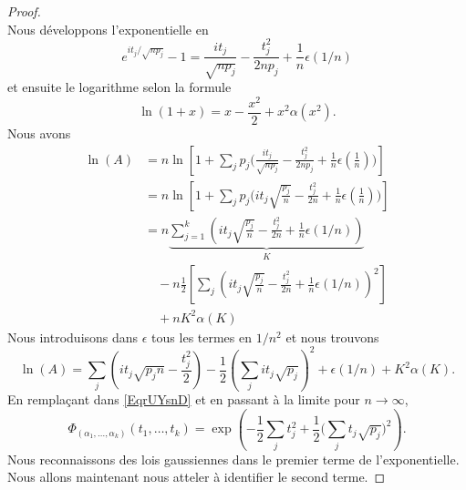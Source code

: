\begin{proof}
\begin{equation}
	\end{equation}
	Nous développons l'exponentielle en
	\begin{equation}
		e^{it_j/\sqrt{np_j}}-1=\frac{ it_j }{ \sqrt{np_j} }-\frac{ t_j^2 }{ 2np_j }+\frac{1}{ n }\epsilon(1/n)
	\end{equation}
	et ensuite le logarithme selon la formule
	\begin{equation}
		\ln(1+x)=x-\frac{ x^2 }{2}+x^2\alpha(x^2).
	\end{equation}
	Nous avons
	\begin{subequations}
		\begin{align}
			\ln(A) & =n\ln\left[ 1+\sum_jp_j\Big( \frac{ it_j }{ \sqrt{np_j} }-\frac{ t_j^2 }{ 2np_j }+\frac{1}{ n }\epsilon(\frac{1}{ n }) \Big) \right]     \\
			       & =n\ln\left[ 1+\sum_jp_j\Big(it_j \sqrt{\frac{ p_j }{ n }}-\frac{ t_j^2 }{ 2n}+\frac{1}{ n }\epsilon(\frac{1}{ n }) \Big) \right]         \\
			       & =n\underbrace{\sum_{j=1}^k\left( it_j\sqrt{\frac{ p_j }{ n }}-\frac{ t_j^2 }{ 2n }+\frac{1}{ n }\epsilon(1/n) \right)}_{K}               \\
			       & \quad-n\frac{ 1 }{2}\left[ \sum_{j}\left( it_j\sqrt{\frac{ p_j }{ n }}-\frac{ t_j^2 }{ 2n }+\frac{1}{ n }\epsilon(1/n) \right)^2 \right] \\
			       & \quad +nK^2\alpha(K)
		\end{align}
	\end{subequations}
	Nous introduisons dans \( \epsilon\) tous les termes en \( 1/n^2\) et nous trouvons
	\begin{equation}
		\ln(A)=\sum_j\left( it_j\sqrt{p_jn}-\frac{ t_j^2 }{2} \right)-\frac{ 1 }{2}\left( \sum_jit_j\sqrt{p_j} \right)^2+\epsilon(1/n)+K^2\alpha(K).
	\end{equation}
	En remplaçant dans \eqref{EqrUYsnD} et en passant à la limite pour \( n\to\infty\),
	\begin{equation}    \label{EaqTXgCW}
		\Phi_{(\alpha_1,\ldots, \alpha_k)}(t_1,\ldots, t_k)=\exp\left( -\frac{ 1 }{2}\sum_jt_j^2+\frac{ 1 }{2}\big( \sum_jt_j\sqrt{p_j} \big)^2 \right).
	\end{equation}
	Nous reconnaissons des lois gaussiennes dans le premier terme de l'exponentielle. Nous allons maintenant nous atteler à identifier le second terme.


\end{proof}
